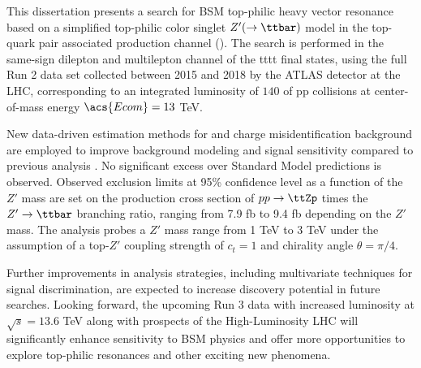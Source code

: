 \documentclass[../thesis.tex]{subfiles}
\begin{document}
\vspace{-1\baselineskip}

This dissertation presents a search for \acs{BSM} top-philic heavy vector resonance based on a simplified top-philic color singlet $Z'(\rightarrow\ttbar)$ model in the top-quark pair associated production channel (\ttZp). The search is performed in the same-sign dilepton and multilepton channel of the \acs{tttt} final states, using the full Run 2 data set collected between 2015 and 2018 by the \acs{ATLAS} detector at the \acs{LHC}, corresponding to an integrated luminosity of $140$ \fb of \acs{pp} collisions at center-of-mass energy $\acs{Ecom}=13$ TeV.

New data-driven estimation methods for \ttW and charge misidentification background are employed to improve background modeling and signal sensitivity compared to previous analysis \citep{theory:ttZp_1los}. No significant excess over Standard Model predictions is observed. Observed exclusion limits at 95\% confidence level as a function of the $Z'$ mass are set on the production cross section of $pp\rightarrow\ttZp$ times the $Z'\rightarrow\ttbar$ branching ratio, ranging from 7.9 fb to 9.4 fb depending on the $Z'$ mass. The analysis probes a $Z'$ mass range from 1 TeV to 3 TeV under the assumption of a top-$Z'$ coupling strength of $c_t=1$ and chirality angle $\theta=\pi/4$.

Further improvements in analysis strategies, including multivariate techniques for signal discrimination, are expected to increase discovery potential in future searches. Looking forward, the upcoming Run 3 data with increased luminosity at $\sqrt{s} = 13.6$ TeV along with prospects of the High-Luminosity \acs{LHC} will significantly enhance sensitivity to \acs{BSM} physics and offer more opportunities to explore top-philic resonances and other exciting new phenomena. 
\end{document}

